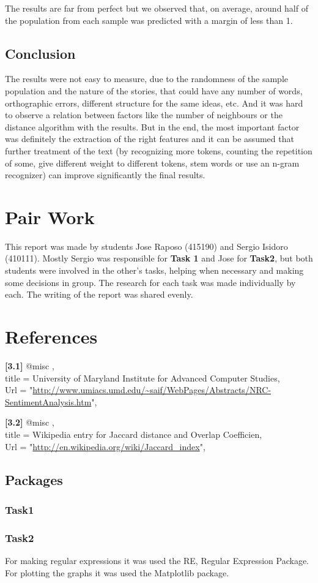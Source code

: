 \documentclass[a4paper,10pt]{article}
\begin{document}
The results are far from perfect but we observed that, on average, around half of the population from each sample was predicted with a margin of less than 1.

\subsection{Conclusion}
The results were not easy to measure, due to the randomness of the sample population and the nature of the stories, that could have any number of words, orthographic errors, different structure for the same ideas, etc. And it was hard to observe a relation between factors like the number of neighbours or the distance algorithm with the results. But in the end, the most important factor was definitely the extraction of the right features and it can be assumed that further treatment of the text (by recognizing more tokens, counting the repetition of some, give different weight to different tokens, stem words or use an n-gram recognizer) can improve significantly the final results.

\section{Pair Work}
This report was made by students Jose Raposo (415190) and Sergio Isidoro (410111). Mostly Sergio was responsible for \textbf{Task 1} and Jose for \textbf{Task2}, but both students were involved in the other's tasks, helping when necessary and making some decisions in group. The research for each task was made individually by each. The writing of the report was shared evenly.

\section{References}

\textbf{[3.1]}
@misc{ ,
	\\ title = {University of Maryland Institute for Advanced Computer Studies}, \\
  	Url = "\url{http://www.umiacs.umd.edu/\~saif/WebPages/Abstracts/NRC-SentimentAnalysis.htm}", \\
}

\textbf{[3.2]}
@misc{ ,
	\\ title = {Wikipedia entry for Jaccard distance and Overlap Coefficien}, \\
  	Url = "\url{http://en.wikipedia.org/wiki/Jaccard_index}", \\
}

\subsection{Packages}
\subsubsection{Task1}
\subsubsection{Task2}
For making regular expressions it was used the RE, Regular Expression Package.
For plotting the graphs it was used the Matplotlib package.
\end{document}
